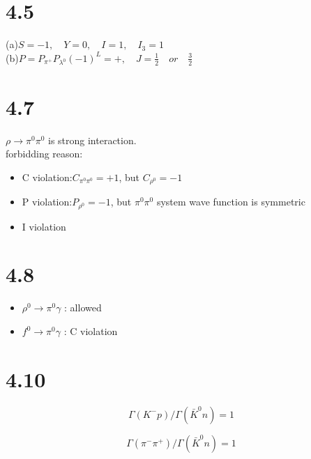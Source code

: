 \documentclass{article}
\begin{document}
\begin{CJK*}{GBK}{song}
\section{4.5}
(a)$S=-1,\quad Y=0,\quad I=1,\quad I_3=1$\\
(b)$P=P_{\pi^+}P_{\lambda^0}(-1)^L=+,\quad J=\frac{1}{2} \quad or\quad \frac{3}{2}$

\section{4.7}
$\rho\rightarrow\pi^0\pi^0$ is strong interaction.\\
forbidding reason:
\begin{itemize}
\item C violation:$C_{\pi^0\pi^0}=+1$, but $C_{\rho^0}=-1$
\item P violation:$P_{\rho^0}=-1$, but $\pi^0\pi^0$ system wave function is symmetric
\item I violation  
\end{itemize}

\section{4.8}
\begin{itemize}
\item $\rho^0\rightarrow\pi^0\gamma$ : allowed
\item $f^0\rightarrow\pi^0\gamma$ : C violation
\end{itemize}

\section{4.10}
\begin{equation}
\Gamma(K^-p)/\Gamma(\bar{K}^0n)=1
\end{equation}

\begin{equation}
\Gamma(\pi^-\pi^+)/\Gamma(\bar{K}^0n)=1
\end{equation}

\end{CJK*}
\end{document}
